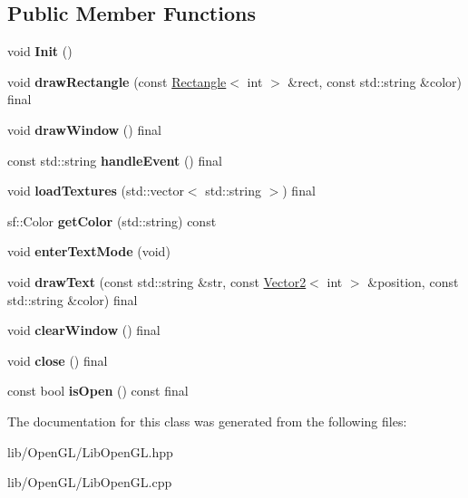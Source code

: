 \subsection*{Public Member Functions}
\begin{DoxyCompactItemize}
\item 
\mbox{\label{class_lib_open_g_l_a12fec3fecead61d7d796d614a636923e}} 
void {\bfseries Init} ()
\item 
\mbox{\label{class_lib_open_g_l_af9b43e06e5b0f06f7e5949bf64ad10cc}} 
void {\bfseries draw\+Rectangle} (const \hyperlink{struct_rectangle}{Rectangle}$<$ int $>$ \&rect, const std\+::string \&color) final
\item 
\mbox{\label{class_lib_open_g_l_a76706c1c8659644160411a712d963156}} 
void {\bfseries draw\+Window} () final
\item 
\mbox{\label{class_lib_open_g_l_a9a4701c7cd4560d911c5610e9f155f97}} 
const std\+::string {\bfseries handle\+Event} () final
\item 
\mbox{\label{class_lib_open_g_l_a2846434326ea029ec1a33768ac9d4c0b}} 
void {\bfseries load\+Textures} (std\+::vector$<$ std\+::string $>$) final
\item 
\mbox{\label{class_lib_open_g_l_ad5d671d5aa8227245b58b82470ce80c2}} 
sf\+::\+Color {\bfseries get\+Color} (std\+::string) const
\item 
\mbox{\label{class_lib_open_g_l_adbc38936d3ca931c0402b070b00bb26f}} 
void {\bfseries enter\+Text\+Mode} (void)
\item 
\mbox{\label{class_lib_open_g_l_af22247b140bc426eb4794bc9857e09b5}} 
void {\bfseries draw\+Text} (const std\+::string \&str, const \hyperlink{struct_vector2}{Vector2}$<$ int $>$ \&position, const std\+::string \&color) final
\item 
\mbox{\label{class_lib_open_g_l_a47bb8a26e010dde8cefa71e30872bb2b}} 
void {\bfseries clear\+Window} () final
\item 
\mbox{\label{class_lib_open_g_l_a3e3809b6dd1d0cd50eea2893448ffa01}} 
void {\bfseries close} () final
\item 
\mbox{\label{class_lib_open_g_l_aa4243545ecc1f17a06e0fc05d645cd37}} 
const bool {\bfseries is\+Open} () const final
\end{DoxyCompactItemize}


The documentation for this class was generated from the following files\+:\begin{DoxyCompactItemize}
\item 
lib/\+Open\+G\+L/Lib\+Open\+G\+L.\+hpp\item 
lib/\+Open\+G\+L/Lib\+Open\+G\+L.\+cpp\end{DoxyCompactItemize}
